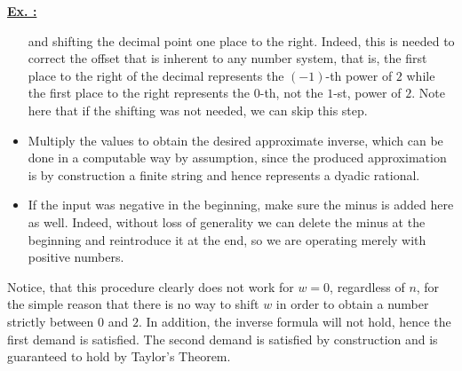 \documentclass[a4paper, 12pt]{article}
\newcounter{excounter}[section]
\newenvironment{Exercise}
    {\refstepcounter{excounter}\underline{\textbf{Ex. \theexcounter:}}}
    {\par\vspace{\baselineskip}}
\begin{document}
\begin{Exercise}
\begin{itemize}
            and shifting the decimal point one place to the right.
            Indeed, this is needed to correct the offset that is inherent to any number system, that is,
            the first place to the right of the decimal represents the $(-1)$-th power of $2$
            while the first place to the right represents the $0$-th, not the $1$-st, power of $2$.
            Note here that if the shifting was not needed, we can skip this step.
        \item
            Multiply the values to obtain the desired approximate inverse,
            which can be done in a computable way by assumption,
            since the produced approximation is by construction a finite string and hence represents a dyadic rational.
        \item
            If the input was negative in the beginning, make sure the minus is added here as well.
            Indeed, without loss of generality we can delete the minus at the beginning and reintroduce it at the end,
            so we are operating merely with positive numbers.
    \end{itemize}
    Notice, that this procedure clearly does not work for $w = 0$, regardless of $n$,
    for the simple reason that there is no way to shift $w$ in order to obtain a number strictly between $0$ and $2$.
    In addition, the inverse formula will not hold, hence the first demand is satisfied.
    The second demand is satisfied by construction and is guaranteed to hold by Taylor's Theorem.
\end{Exercise}
\end{document}
